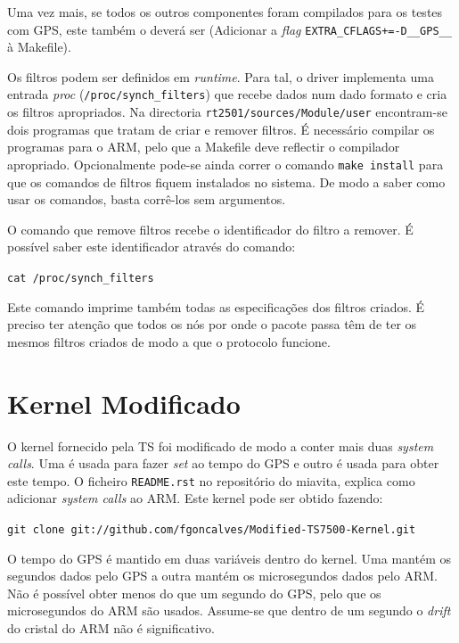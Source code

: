 \documentclass[10pt,a4paper,oneside]{book}
\begin{document}
Uma vez mais, se todos os outros componentes foram compilados para os testes com GPS, este também o deverá ser (Adicionar a \emph{flag} {\tt EXTRA\_CFLAGS+=-D\_\_GPS\_\_} à Makefile).

Os filtros podem ser definidos em \emph{runtime}. Para tal, o driver implementa uma entrada \emph{proc} ({\tt /proc/synch\_filters}) que recebe dados num dado formato e cria os filtros apropriados. Na directoria {\tt rt2501/sources/Module/user} encontram-se dois programas que tratam de criar e remover filtros. É necessário compilar os programas para o ARM, pelo que a Makefile deve reflectir o compilador apropriado. Opcionalmente pode-se ainda correr o comando {\tt make install} para que os comandos de filtros fiquem instalados no sistema. De modo a saber como usar os comandos, basta corrê-los sem argumentos.

O comando que remove filtros recebe o identificador do filtro a remover. É possível saber este identificador através do comando:

\begin{flushleft}
  {\tt cat /proc/synch\_filters}
\end{flushleft}

Este comando imprime também todas as especificações dos filtros criados. É preciso ter atenção que todos os nós por onde o pacote passa têm de ter os mesmos filtros criados de modo a que o protocolo funcione.

\section{Kernel Modificado}\label{sec:kernel}

O kernel fornecido pela TS foi modificado de modo a conter mais duas \emph{system calls}. Uma é usada para fazer \emph{set} ao tempo do GPS e outro é usada para obter este tempo. O ficheiro {\tt README.rst} no repositório do miavita, explica como adicionar \emph{system calls} ao ARM. Este kernel pode ser obtido fazendo:

\begin{center}
{\tt git clone git://github.com/fgoncalves/Modified-TS7500-Kernel.git}
\end{center}

O tempo do GPS é mantido em duas variáveis dentro do kernel. Uma mantém os segundos dados pelo GPS a outra mantém os microsegundos dados pelo ARM. Não é possível obter menos do que um segundo do GPS, pelo que os microsegundos do ARM são usados. Assume-se que dentro de um segundo o \emph{drift} do cristal do ARM não é significativo.
\end{document}
